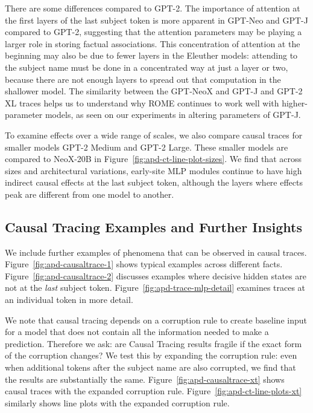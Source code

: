 \documentclass{article}
\newcommand{\reffig}[1]{Figure~\ref{fig:#1}}
\begin{document}
\begin{appendices}
There are some differences compared to GPT-2.   The importance of attention at the first layers of the last subject token is more apparent in GPT-Neo and GPT-J compared to GPT-2,   suggesting that the attention parameters may be playing a larger role in storing factual associations.  This concentration of attention at the beginning may also be due to fewer layers in the Eleuther models: attending to the subject name must be done in a concentrated way at just a layer or two, because there are not enough layers to spread out that computation in the shallower model.
The similarity between the GPT-NeoX and GPT-J and GPT-2 XL traces helps us to understand why ROME continues to work well with higher-parameter models, as seen on our experiments in altering parameters of GPT-J.

To examine effects over a wide range of scales, we also compare causal traces for smaller models GPT-2 Medium and GPT-2 Large.  These smaller models are compared to NeoX-20B in \reffig{apd-ct-line-plot-sizes}.  We find that across sizes and architectural variations, early-site MLP modules continue to have high indirect causal effects at the last subject token, although the layers where effects peak are different from one model to another.

\subsection{Causal Tracing Examples and Further Insights}
\label{apd:causal-tracing-variations}

We include further examples of phenomena that can be observed in causal traces. \reffig{apd-causaltrace-1} shows typical examples across different facts. \reffig{apd-causaltrace-2} discusses examples where decisive hidden states are not at the \textit{last} subject token.  \reffig{apd-trace-mlp-detail} examines traces at an individual token in more detail. 

We note that causal tracing depends on a corruption rule to create baseline input for a model that does not contain all the information needed to make a prediction.  Therefore we ask: are Causal Tracing results fragile if the exact form of the corruption changes?  We test this by expanding the corruption rule: even when additional tokens after the subject name are also corrupted, we find that the results are substantially the same. \reffig{apd-causaltrace-xt} shows causal traces with the expanded corruption rule.
\reffig{apd-ct-line-plots-xt} similarly shows line plots with the expanded corruption rule.


\end{appendices}
\end{document}
